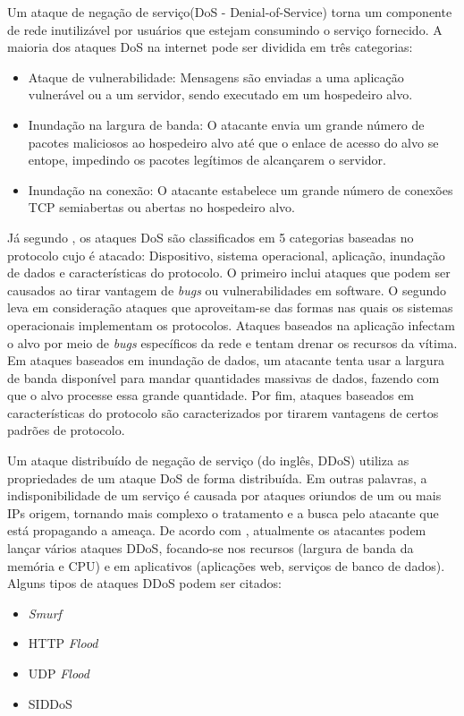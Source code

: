 Um ataque de negação de serviço(DoS - Denial-of-Service) torna um componente de rede inutilizável por usuários que estejam consumindo o serviço fornecido. A maioria dos ataques DoS na internet pode ser dividida em três categorias: \cite{kurose}
\begin{itemize}
	\item Ataque de vulnerabilidade: Mensagens são enviadas a uma aplicação vulnerável ou a um servidor, sendo executado em um hospedeiro alvo.
	\item Inundação na largura de banda: O atacante envia um grande número de pacotes maliciosos ao hospedeiro alvo até que o enlace de acesso do alvo se entope, impedindo os pacotes legítimos de alcançarem o servidor. 
	\item Inundação na conexão: O atacante estabelece um grande número de conexões TCP semiabertas ou abertas no hospedeiro alvo. 
\end{itemize}
Já segundo \cite{ddosatacks}, os ataques DoS são classificados em 5 categorias baseadas no protocolo cujo é atacado: Dispositivo, sistema operacional, aplicação, inundação de dados e características do protocolo. O primeiro inclui ataques que podem ser causados ao tirar vantagem de \textit{bugs} ou vulnerabilidades em software. O segundo leva em consideração ataques que aproveitam-se das formas nas quais os sistemas operacionais implementam os protocolos. Ataques baseados na aplicação infectam o alvo por meio de \textit{bugs} específicos da rede e tentam drenar os recursos da vítima. Em ataques baseados em inundação de dados, um atacante tenta usar a largura de banda disponível para mandar quantidades massivas de dados, fazendo com que o alvo processe essa grande quantidade. Por fim, ataques baseados em características do protocolo são caracterizados por tirarem vantagens de certos padrões de protocolo.
 
Um ataque distribuído de negação de serviço (do inglês, DDoS) utiliza as propriedades de um ataque DoS de forma distribuída. Em outras palavras, a indisponibilidade de um serviço é causada por ataques oriundos de um ou mais IPs origem, tornando mais complexo o tratamento e a busca pelo atacante que está propagando a ameaça. De acordo com \cite{WANG2015308}, atualmente os atacantes podem lançar vários ataques DDoS, focando-se nos recursos (largura de banda da memória e CPU) e em aplicativos (aplicações web, serviços de banco de dados). Alguns tipos de ataques DDoS podem ser citados:

\begin{itemize}
	 \item \textit{Smurf}
	 \item HTTP \textit{Flood}
	 \item UDP \textit{Flood}
	 \item SIDDoS

\end{itemize}

